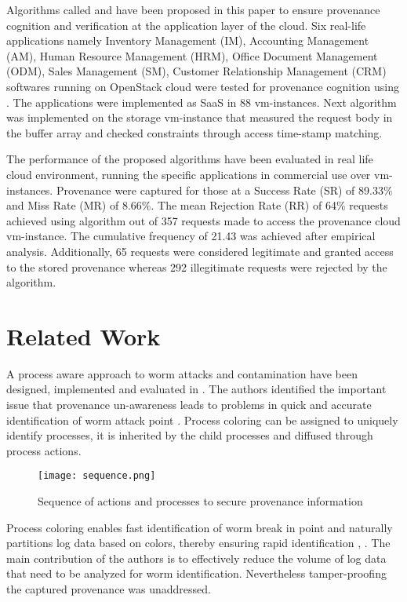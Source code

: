 \documentclass[conference]{IEEEtran}
\begin{document}
Algorithms called  and  have been proposed in this paper to ensure provenance cognition and verification at the application layer of the cloud. Six real-life applications namely Inventory Management (IM), Accounting Management (AM), Human Resource Management (HRM), Office Document Management (ODM), Sales Management (SM), Customer Relationship Management (CRM) softwares running on OpenStack cloud were tested for provenance cognition using . The applications were implemented as SaaS in 88 vm-instances. Next  algorithm was implemented on the storage vm-instance that measured the request body in the buffer array and checked constraints through access time-stamp matching.

The performance of the proposed algorithms have been evaluated in real life cloud environment, running the specific applications in commercial use over vm-instances. Provenance were captured for those at a Success Rate (SR) of 89.33\% and Miss Rate (MR) of 8.66\%. The mean Rejection Rate (RR) of 64\% requests achieved using  algorithm out of 357 requests made to access the provenance cloud vm-instance. The cumulative frequency of 21.43 was achieved after empirical analysis. Additionally, 65 requests were considered legitimate and granted access to the stored provenance whereas 292 illegitimate requests were rejected by the  algorithm.

\section{Related Work}
A process aware approach to worm attacks and contamination have been designed, implemented and evaluated in \cite{idika2013probabilistic}. The authors identified the important issue that provenance un-awareness leads to problems in quick and accurate identification of worm attack point \cite{idika2013probabilistic}. Process coloring can be assigned to uniquely identify processes, it is inherited by the child processes and diffused through process actions.

\begin{figure*}[t!]
\centering
\texttt{[image: sequence.png]}
\caption{Sequence of actions and processes to secure provenance information}
\label{figure3}
\end{figure*}

Process coloring enables fast identification of worm break in point and naturally partitions log data based on colors, thereby ensuring rapid identification \cite{marinho2012provmanager}, \cite{yu2012novel}. The main contribution of the authors is to effectively reduce the volume of log data that need to be analyzed for worm identification. Nevertheless tamper-proofing the captured provenance was unaddressed.
\end{document}
